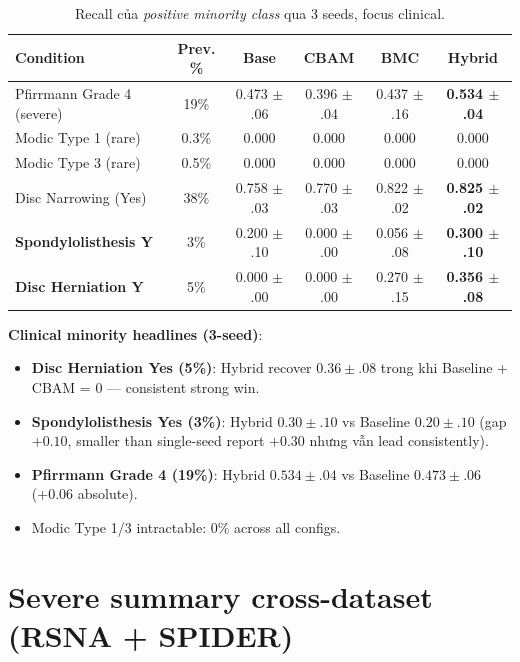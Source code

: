 \documentclass[11pt,a4paper]{article}
\newcommand{\best}[1]{\textbf{#1}}
\begin{document}
\begin{table}[h]
\centering
\caption{Recall của \emph{positive minority class} qua 3 seeds, focus clinical.}
\small
\begin{tabular}{@{}lccccc@{}}
\toprule
\rowcolor{tablehdr}
Condition & Prev. \% & Base & CBAM & BMC & Hybrid \\
\midrule
Pfirrmann Grade 4 (severe)   & 19\% & 0.473 $\pm$ .06 & 0.396 $\pm$ .04 & 0.437 $\pm$ .16 & \best{0.534 $\pm$ .04} \\
Modic Type 1 (rare)          & 0.3\%& 0.000 & 0.000 & 0.000 & 0.000 \\
Modic Type 3 (rare)          & 0.5\%& 0.000 & 0.000 & 0.000 & 0.000 \\
Disc Narrowing (Yes)         & 38\% & 0.758 $\pm$ .03 & 0.770 $\pm$ .03 & 0.822 $\pm$ .02 & \best{0.825 $\pm$ .02} \\
\textbf{Spondylolisthesis Y} & 3\% & 0.200 $\pm$ .10 & 0.000 $\pm$ .00 & 0.056 $\pm$ .08 & \best{0.300 $\pm$ .10} \\
\textbf{Disc Herniation Y}   & 5\% & 0.000 $\pm$ .00 & 0.000 $\pm$ .00 & 0.270 $\pm$ .15 & \best{0.356 $\pm$ .08} \\
\bottomrule
\end{tabular}
\end{table}

\noindent\textbf{Clinical minority headlines (3-seed)}:
\begin{itemize}
\item \textbf{Disc Herniation Yes (5\%)}: Hybrid recover $0.36 \pm .08$
trong khi Baseline + CBAM = $0$ --- consistent strong win.
\item \textbf{Spondylolisthesis Yes (3\%)}: Hybrid $0.30 \pm .10$ vs
Baseline $0.20 \pm .10$ (gap $+0.10$, smaller than single-seed
report $+0.30$ nhưng vẫn lead consistently).
\item \textbf{Pfirrmann Grade 4 (19\%)}: Hybrid $0.534 \pm .04$ vs
Baseline $0.473 \pm .06$ (+0.06 absolute).
\item Modic Type 1/3 intractable: $0\%$ across all configs.
\end{itemize}

\section{Severe summary cross-dataset (RSNA + SPIDER)}
\end{document}
